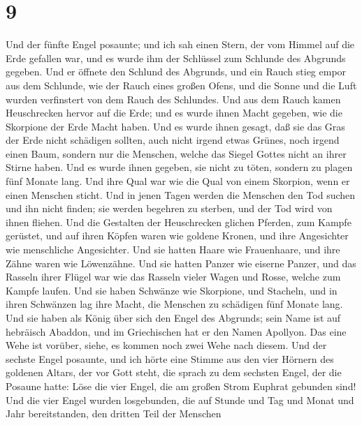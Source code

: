 \hypertarget{section-8}{%
\section{9}\label{section-8}}

 Und der fünfte Engel posaunte; und ich sah einen Stern,
der vom Himmel auf die Erde gefallen war, und es wurde ihm der Schlüssel
zum Schlunde des Abgrunds gegeben.  Und er öffnete den
Schlund des Abgrunds, und ein Rauch stieg empor aus dem Schlunde, wie
der Rauch eines großen Ofens, und die Sonne und die Luft wurden
verfinstert von dem Rauch des Schlundes.  Und aus dem
Rauch kamen Heuschrecken hervor auf die Erde; und es wurde ihnen Macht
gegeben, wie die Skorpione der Erde Macht haben.  Und es
wurde ihnen gesagt, daß sie das Gras der Erde nicht schädigen sollten,
auch nicht irgend etwas Grünes, noch irgend einen Baum, sondern nur die
Menschen, welche das Siegel Gottes nicht an ihrer Stirne haben.
 Und es wurde ihnen gegeben, sie nicht zu töten, sondern
zu plagen fünf Monate lang. Und ihre Qual war wie die Qual von einem
Skorpion, wenn er einen Menschen sticht.  Und in jenen
Tagen werden die Menschen den Tod suchen und ihn nicht finden; sie
werden begehren zu sterben, und der Tod wird von ihnen fliehen.
 Und die Gestalten der Heuschrecken glichen Pferden, zum
Kampfe gerüstet, und auf ihren Köpfen waren wie goldene Kronen, und ihre
Angesichter wie menschliche Angesichter.  Und sie hatten
Haare wie Frauenhaare, und ihre Zähne waren wie Löwenzähne.
 Und sie hatten Panzer wie eiserne Panzer, und das Rasseln
ihrer Flügel war wie das Rasseln vieler Wagen und Rosse, welche zum
Kampfe laufen.  Und sie haben Schwänze wie Skorpione, und
Stacheln, und in ihren Schwänzen lag ihre Macht, die Menschen zu
schädigen fünf Monate lang.  Und sie haben als König über
sich den Engel des Abgrunds; sein Name ist auf hebräisch Abaddon, und im
Griechischen hat er den Namen Apollyon.  Das eine Wehe
ist vorüber, siehe, es kommen noch zwei Wehe nach diesem.
 Und der sechste Engel posaunte, und ich hörte eine
Stimme aus den vier Hörnern des goldenen Altars, der vor Gott steht,
 die sprach zu dem sechsten Engel, der die Posaune hatte:
Löse die vier Engel, die am großen Strom Euphrat gebunden sind!
 Und die vier Engel wurden losgebunden, die auf Stunde
und Tag und Monat und Jahr bereitstanden, den dritten Teil der Menschen
